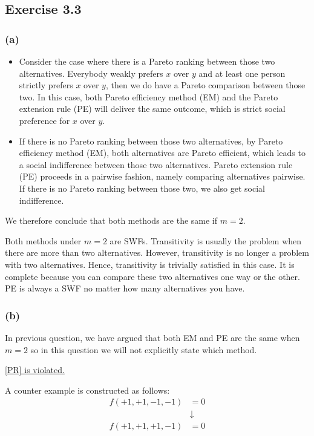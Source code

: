 \documentclass[a4paper]{article}
\begin{document}
\subsection*{Exercise 3.3}

\subsubsection*{(a)}

\begin{itemize}
    \item Consider the case where there is a Pareto ranking between those two alternatives. Everybody weakly prefers $x$ over $y$ and at least one person strictly prefers $x$ over $y$, then we do have a Pareto comparison between those two. In this case, both Pareto efficiency method (EM) and the Pareto extension rule (PE) will deliver the same outcome, which is strict social preference for $x$ over $y$.
    \item If there is no Pareto ranking between those two alternatives, by Pareto efficiency method (EM), both alternatives are Pareto efficient, which leads to a social indifference between those two alternatives. Pareto extension rule (PE) proceeds in a pairwise fashion, namely comparing alternatives pairwise. If there is no Pareto ranking between those two, we also get social indifference.
\end{itemize}
We therefore conclude that both methods are the same if $m=2$.

Both methods under $m=2$ are SWFs. Transitivity is usually the problem when there are more than two alternatives. However, transitivity is no longer a problem with two alternatives. Hence, transitivity is trivially satisfied in this case. It is complete because you can compare these two alternatives one way or the other. PE is always a SWF no matter how many alternatives you have. 

\subsubsection*{(b)}

In previous question, we have argued that both EM and PE are the same when $m=2$ so in this question we will not explicitly state which method.

\underline{[PR] is violated.}

A counter example is constructed as follows:
\begin{align*}
    f(+1, +1, -1, -1)&=0 \\
     & \downarrow        \\
    f(+1, +1, +1, -1)&=0 
\end{align*}
\end{document}
